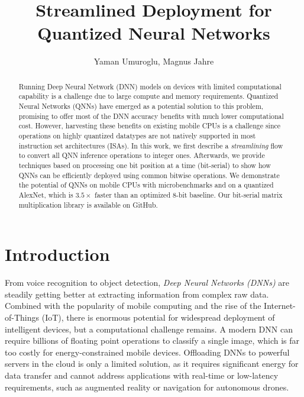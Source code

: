 \documentclass[sigconf]{acmart}
\begin{document}
\title{Streamlined Deployment for Quantized Neural Networks}


\author{Yaman Umuroglu, Magnus Jahre}

\renewcommand{\shortauthors}{Y. Umuroglu et al.}

\newcommand{\ours}{\textsc{BitSerialGEMM}}
\newcommand{\qnn}[2]{$\mathbf{W^#1A^#2}$}
\newcommand{\bitplane}[2]{$#1[#2]$}
\newcommand{\pluseq}{\mathrel{+}=}
\newcommand{\myceil}[1]{\left \lceil #1 \right \rceil }
\newcommand{\TODO}[1]{\todo[inline]{#1}}

\begin{abstract}
Running Deep Neural Network (DNN) models on devices with limited computational capability is a challenge due to large compute and memory requirements.
Quantized Neural Networks (QNNs) have emerged as a potential solution to this problem, promising to offer most of the DNN accuracy benefits with much lower computational cost.
However, harvesting these benefits on existing mobile CPUs is a challenge since operations on highly quantized datatypes are not natively supported in most instruction set architectures (ISAs).
In this work, we first describe a \emph{streamlining} flow to convert all QNN inference operations to integer ones.
Afterwards, we provide techniques based on processing one bit position at a time (bit-serial) to show how QNNs can be efficiently deployed using common bitwise operations.
We demonstrate the potential of QNNs on mobile CPUs with microbenchmarks and on a quantized AlexNet, which is $3.5\times$ faster than an optimized 8-bit baseline.
Our bit-serial matrix multiplication library is available on GitHub.
\end{abstract}

\maketitle
\setlength{\textfloatsep}{5pt}

\section{Introduction}

From voice recognition to object detection, \emph{Deep Neural Networks (DNNs)} are steadily getting better at extracting information from complex raw data.
Combined with the popularity of mobile computing and the rise of the Internet-of-Things (IoT), there is enormous potential for widespread deployment of intelligent devices, but a computational challenge remains.
A modern DNN can require billions of floating point operations to classify a single image, which is far too costly for energy-constrained mobile devices.
Offloading DNNs to powerful servers in the cloud is only a limited solution, as it requires significant energy for data transfer and cannot address applications with real-time or low-latency requirements, such as augmented reality or navigation for autonomous drones.
\end{document}
